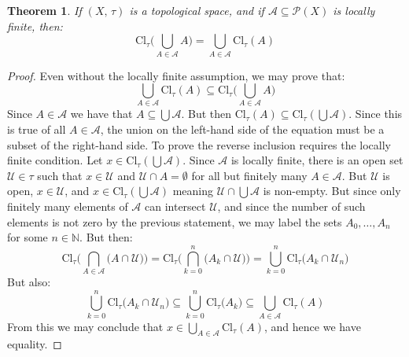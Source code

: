 \documentclass{article}
\theoremstyle{plain}
\newtheorem{theorem}{Theorem}[section]
\theoremstyle{normal}
\begin{document}
        \begin{theorem}
            If $(X,\,\tau)$ is a topological space, and if
            $\mathcal{A}\subseteq\mathcal{P}(X)$ is locally finite, then:
            \begin{equation}
                \textrm{Cl}_{\tau}\Big(\bigcup_{A\in\mathcal{A}}A\Big)
                =\bigcup_{A\in\mathcal{A}}\textrm{Cl}_{\tau}(A)
            \end{equation}
        \end{theorem}
        \begin{proof}
            Even without the locally finite assumption, we may prove that:
            \begin{equation}
                \bigcup_{A\in\mathcal{A}}\textrm{Cl}_{\tau}(A)\subseteq
                \textrm{Cl}_{\tau}\Big(\bigcup_{A\in\mathcal{A}}A\Big)
            \end{equation}
            Since $A\in\mathcal{A}$ we have that $A\subseteq\bigcup\mathcal{A}$.
            But then
            $\textrm{Cl}_{\tau}(A)\subseteq\textrm{Cl}_{\tau}(\bigcup\mathcal{A})$.
            Since this is true of all $A\in\mathcal{A}$, the union on the
            left-hand side of the equation must be a subset of the
            right-hand side. To prove the reverse inclusion requires the
            locally finite condition. Let
            $x\in\textrm{Cl}_{\tau}(\bigcup\mathcal{A})$. Since
            $\mathcal{A}$ is locally finite, there is an open set
            $\mathcal{U}\in\tau$ such that $x\in\mathcal{U}$ and
            $\mathcal{U}\cap{A}=\emptyset$ for all but finitely many
            $A\in\mathcal{A}$. But $\mathcal{U}$ is open, $x\in\mathcal{U}$,
            and $x\in\textrm{Cl}_{\tau}(\bigcup\mathcal{A})$ meaning
            $\mathcal{U}\cap\bigcup\mathcal{A}$ is non-empty. But since
            only finitely many elements of $\mathcal{A}$ can intersect
            $\mathcal{U}$, and since the number of such elements is not zero
            by the previous statement, we may label the sets
            $A_{0},\dots,A_{n}$ for some $n\in\mathbb{N}$. But then:
            \begin{equation}
                \textrm{Cl}_{\tau}\Big(
                    \bigcap_{A\in\mathcal{A}}\big(A\cap\mathcal{U}\big)
                \Big)
                =\textrm{Cl}_{\tau}\Big(
                    \bigcap_{k=0}^{n}\big(A_{k}\cap\mathcal{U}\big)
                \Big)
                =\bigcup_{k=0}^{n}\textrm{Cl}_{\tau}\big(
                    A_{k}\cap\mathcal{U}_{n}
                \big)
            \end{equation}
            But also:
            \begin{equation}
                \bigcup_{k=0}^{n}\textrm{Cl}_{\tau}\big(
                    A_{k}\cap\mathcal{U}_{n}
                \big)
                \subseteq
                \bigcup_{k=0}^{n}\textrm{Cl}_{\tau}\big(A_{k}\big)
                \subseteq\bigcup_{A\in\mathcal{A}}\textrm{Cl}_{\tau}(A)
            \end{equation}
            From this we may conclude that
            $x\in\bigcup_{A\in\mathcal{A}}\textrm{Cl}_{\tau}(A)$, and hence
            we have equality.
        \end{proof}
\end{document}
